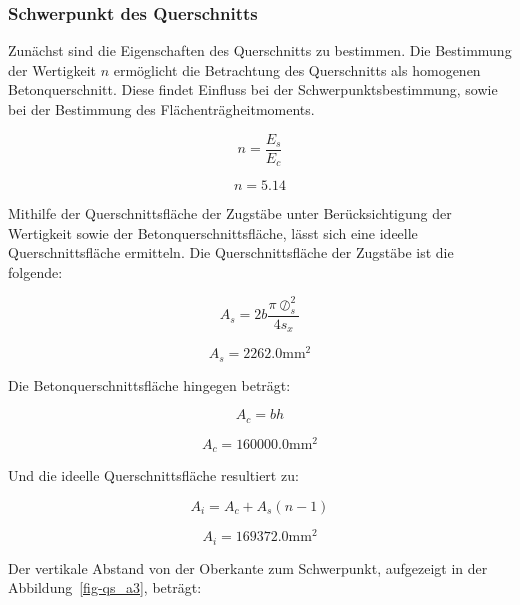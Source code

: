\documentclass[
  12pt,
  letterpaper,
  egregdoesnotlikesansseriftitles]{scrreprt}
\begin{document}
\subsubsection{Schwerpunkt des
Querschnitts}\label{schwerpunkt-des-querschnitts}

Zunächst sind die Eigenschaften des Querschnitts zu bestimmen. Die
Bestimmung der Wertigkeit \(n\) ermöglicht die Betrachtung des
Querschnitts als homogenen Betonquerschnitt. Diese findet Einfluss bei
der Schwerpunktsbestimmung, sowie bei der Bestimmung des
Flächenträgheitmoments.

\begin{equation}n = \frac{E_{s}}{E_{c}}\end{equation}

\begin{equation}n = 5.14\end{equation}

Mithilfe der Querschnittsfläche der Zugstäbe unter Berücksichtigung der
Wertigkeit sowie der Betonquerschnittsfläche, lässt sich eine ideelle
Querschnittsfläche ermitteln. Die Querschnittsfläche der Zugstäbe ist
die folgende:

\begin{equation}A_{s} = 2 b \frac{\pi \oslash_{s}^{2}}{4 s_{x}}\end{equation}

\begin{equation}A_{s} = 2262.0 \text{mm}^{2}\end{equation}

Die Betonquerschnittsfläche hingegen beträgt:

\begin{equation}A_{c} = b h\end{equation}

\begin{equation}A_{c} = 160000.0 \text{mm}^{2}\end{equation}

Und die ideelle Querschnittsfläche resultiert zu:

\begin{equation}A_{i} = A_{c} + A_{s} \left(n - 1\right)\end{equation}

\begin{equation}A_{i} = 169372.0 \text{mm}^{2}\end{equation}

Der vertikale Abstand von der Oberkante zum Schwerpunkt, aufgezeigt in
der Abbildung~\ref{fig-qs_a3}, beträgt:
\end{document}

